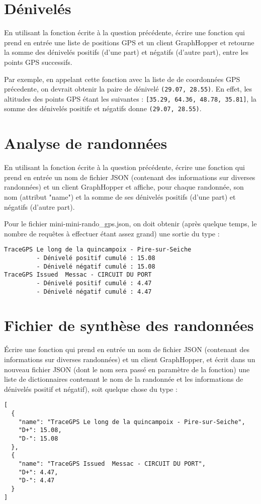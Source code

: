 \documentclass[11pt,a4paper]{article}
\begin{document}
\section{Dénivelés}

En utilisant la fonction écrite à la question précédente, écrire
une fonction qui prend en entrée une liste de positions GPS et un client GraphHopper et retourne la somme des dénivelés positifs (d’une part) et négatifs (d’autre part), entre les points GPS successifs. 

Par exemple, en appelant cette fonction avec la liste de de coordonnées GPS précedente, on devrait obtenir la paire de dénivelé \verb+(29.07, 28.55)+.
En effet, les altitudes des points GPS étant les suivantes :
\verb+[35.29, 64.36, 48.78, 35.81]+,  la somme des dénivelés positife et négatifs donne \verb+(29.07, 28.55)+.

\section{Analyse de randonnées}

En utilisant la fonction écrite à la question précédente, écrire une fonction qui prend en entrée un nom de fichier JSON (contenant des informations sur diverses randonnées) et un client GraphHopper et affiche, pour chaque randonnée, son nom (attribut "name") et la somme de ses dénivelés positifs (d’une part) et négatifs (d’autre part). 

Pour le fichier mini-mini-rando\_gps.json, on doit obtenir (après quelque temps, le nombre de requêtes à effectuer étant assez grand) une sortie du type :
\begin{verbatim}
TraceGPS Le long de la quincampoix - Pire-sur-Seiche 
         - Dénivelé positif cumulé : 15.08
         - Dénivelé négatif cumulé : 15.08
TraceGPS Issued  Messac - CIRCUIT DU PORT 
         - Dénivelé positif cumulé : 4.47
         - Dénivelé négatif cumulé : 4.47
\end{verbatim}
\section{Fichier de synthèse des randonnées}

Écrire une fonction qui prend en entrée un nom de fichier JSON (contenant des informations sur diverses randonnées) et un client GraphHopper, et écrit dans un nouveau fichier JSON (dont le nom sera passé en paramètre de la fonction) une liste de dictionnaires contenant le nom de la randonnée et les informations de dénivelés positif et négatif), soit quelque chose du type :
\begin{verbatim}
[
  {
    "name": "TraceGPS Le long de la quincampoix - Pire-sur-Seiche",
    "D+": 15.08,
    "D-": 15.08
  },
  {
    "name": "TraceGPS Issued  Messac - CIRCUIT DU PORT",
    "D+": 4.47,
    "D-": 4.47
  }
]
\end{verbatim}
\end{document}
